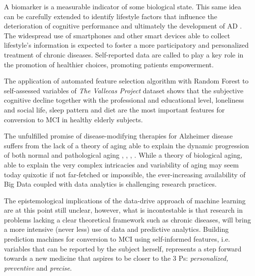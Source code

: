 \documentclass[preprint,12pt]{elsarticle}
\begin{document}
A biomarker is a measurable indicator of some biological state. This same idea can be carefully extended to identify lifestyle factors that influence the deterioration of cognitive performance and ultimately the development of AD \cite{ellis2010addressing}. The widespread use of smartphones and other smart devices able to collect lifestyle's information is expected to foster a more participatory and personalized treatment of chronic diseases. Self-reported data are called to play a key role in the promotion of healthier choices, promoting patients empowerment. 

The application of automated feature selection algorithm with Random Forest to self-assessed variables of \emph{The Vallecas Project} dataset shows that the subjective cognitive decline together with the professional and educational level, loneliness and social life, sleep pattern and diet are the most important features for conversion to MCI in healthy elderly subjects.

The unfulfilled promise of disease-modifying therapies for Alzheimer disease suffers from the lack of a theory of aging able to explain the dynamic progression of both normal and pathological aging \cite{cerella1985information}, \cite{mangel2001complex}, \cite{sleimen2014aging}, \cite{cohen2016complex}.
While a theory of biological aging, able to explain the very complex intricacies and variability of aging may seem today quixotic if not far-fetched or impossible, the ever-increasing availability of Big Data coupled with data analytics is challenging research practices. 

The epistemological implications of the data-drive approach of machine learning are at this point still unclear, however, what is incontestable is that research in problems lacking a clear theoretical framework such as chronic diseases, will bring a more intensive (never less) use of data and predictive analytics. Building prediction machines for conversion to MCI using self-informed features, i.e. variables that can be reported by the subject herself, represents a step forward towards a new medicine that aspires to be closer to the 3 Ps: \emph{personalized, preventive} and \emph{precise}. 










\end{document}
